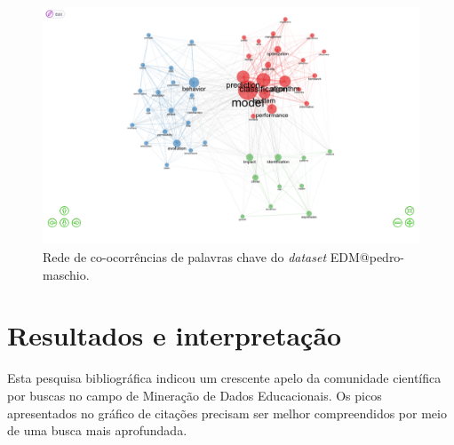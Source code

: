 \begin{figure}[H]
    \centering
    \includegraphics[width=1\textwidth]{experiments/pedro-maschio/PesquisaBibliogr/MineracaoDadosEducacionais/images/co-ocorrencias.png}
    \caption{Rede de co-ocorrências de palavras chave do \textit{dataset} EDM@pedro-maschio.}
    \label{fig:co-ocorrencias:EDM@pedro-maschio}
\end{figure}


\section{Resultados e interpretação}

Esta pesquisa bibliográfica indicou um crescente apelo da comunidade científica por buscas no campo de Mineração de Dados Educacionais. Os picos apresentados no gráfico de citações precisam ser melhor compreendidos por meio de uma busca mais aprofundada.

